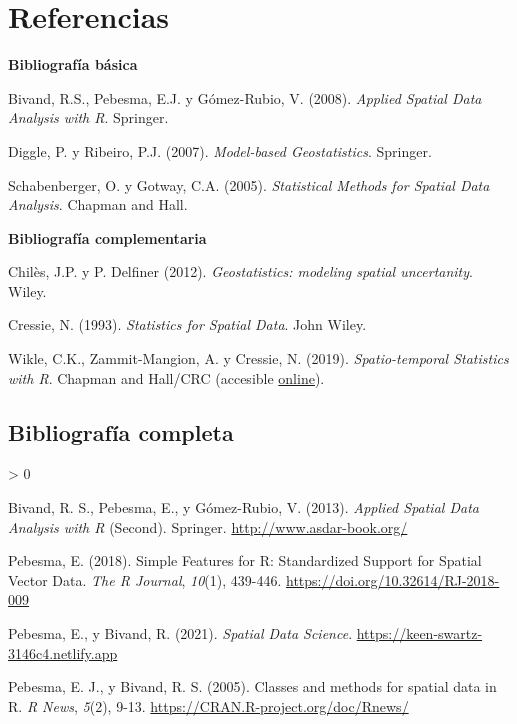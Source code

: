 \documentclass[
  spanish,
]{book}
\theoremstyle{break}
\newlength{\cslhangindent}
\newenvironment{CSLReferences}[2] %
 {%
  \setlength{\parindent}{0pt}
  \ifodd #1 \everypar{\setlength{\hangindent}{\cslhangindent}}\ignorespaces\fi
  \ifnum #2 > 0
  \setlength{\parskip}{#2\baselineskip}
  \fi
 }%
 {}
\theoremstyle{definition}
\theoremstyle{definition}
\theoremstyle{definition}
\theoremstyle{definition}
\theoremstyle{remark}
\begin{document}
\hypertarget{referencias}{%
\chapter*{Referencias}\label{referencias}}

\textbf{Bibliografía básica}

Bivand, R.S., Pebesma, E.J. y Gómez-Rubio, V. (2008). \emph{Applied Spatial Data Analysis with R}. Springer.

Diggle, P. y Ribeiro, P.J. (2007). \emph{Model-based Geostatistics}. Springer.

Schabenberger, O. y Gotway, C.A. (2005). \emph{Statistical Methods for Spatial Data Analysis}. Chapman and Hall.

\textbf{Bibliografía complementaria}

Chilès, J.P. y P. Delfiner (2012). \emph{Geostatistics: modeling spatial uncertanity}. Wiley.

Cressie, N. (1993). \emph{Statistics for Spatial Data}. John Wiley.

Wikle, C.K., Zammit-Mangion, A. y Cressie, N. (2019). \emph{Spatio-temporal Statistics with R}. Chapman and Hall/CRC (accesible \href{https://spacetimewithr.org}{online}).

\hypertarget{bibliografuxeda-completa}{%
\section*{Bibliografía completa}\label{bibliografuxeda-completa}}

\hypertarget{refs}{}
\begin{CSLReferences}{1}{0}
\leavevmode\hypertarget{ref-Bivand2013}{}%
Bivand, R. S., Pebesma, E., y Gómez-Rubio, V. (2013). \emph{Applied Spatial Data Analysis with {R}} (Second). Springer. \url{http://www.asdar-book.org/}

\leavevmode\hypertarget{ref-Pebesma2018}{}%
Pebesma, E. (2018). {Simple Features for R: Standardized Support for Spatial Vector Data}. \emph{{The R Journal}}, \emph{10}(1), 439-446. \url{https://doi.org/10.32614/RJ-2018-009}

\leavevmode\hypertarget{ref-Pebesma2021}{}%
Pebesma, E., y Bivand, R. (2021). \emph{Spatial Data Science}. \url{https://keen-swartz-3146c4.netlify.app}

\leavevmode\hypertarget{ref-Pebesma2005}{}%
Pebesma, E. J., y Bivand, R. S. (2005). Classes and methods for spatial data in {R}. \emph{R News}, \emph{5}(2), 9-13. \url{https://CRAN.R-project.org/doc/Rnews/}

\end{CSLReferences}
\end{document}
